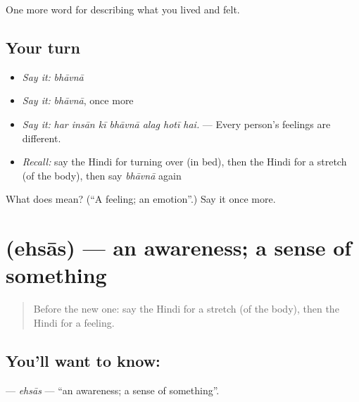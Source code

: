 \begin{grammarlens}[title={What you've built}]
One more word for describing what you lived and felt.
\end{grammarlens}

\subsection*{Your turn}
\begin{itemize}
\raggedright
  \item \emph{Say it:} \emph{bhāvnā}
  \item \emph{Say it:} \emph{bhāvnā}, once more
  \item \emph{Say it:} \emph{har insān kī bhāvnā alag hotī hai.} — Every person's feelings are different.
  \item \emph{Recall:} say the Hindi for turning over (in bed), then the Hindi for a stretch (of the body), then say \emph{bhāvnā} again
\end{itemize}

\begin{tcolorbox}[breakable,colback=teal!4,colframe=teal!35!black,title={Before you move on}]
What does  mean? (\textquotedblleft{}A feeling; an emotion\textquotedblright{}.) Say it once more.
\end{tcolorbox}
\section[\texorpdfstring{\hi{एहसास} (ehsās)}{एहसास (ehsās)}]{ (ehsās) — an awareness; a sense of something}

\label{lesson:HI-C452-ehsas}



\begin{quote}
Before the new one: say the Hindi for a stretch (of the body), then the Hindi for a feeling.
\end{quote}

\subsection*{You'll want to know: }
\textbf{} — \emph{ehsās} — \textquotedblleft{}an awareness; a sense of something\textquotedblright{}.

\begin{quote}
      
\end{quote}

